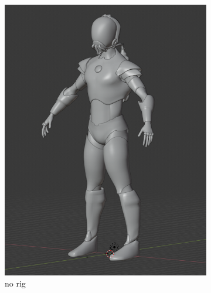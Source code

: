 \begin{figure}
\centering
\begin{subfigure}{.33\textwidth}
  \centering
  \includegraphics[width=\linewidth]{Figures/rig0}
  \caption{no rig}
  \label{fig:FK1}
\end{subfigure}%
\begin{subfigure}{.33\textwidth}
  \centering

\end{subfigure}
\end{figure}
